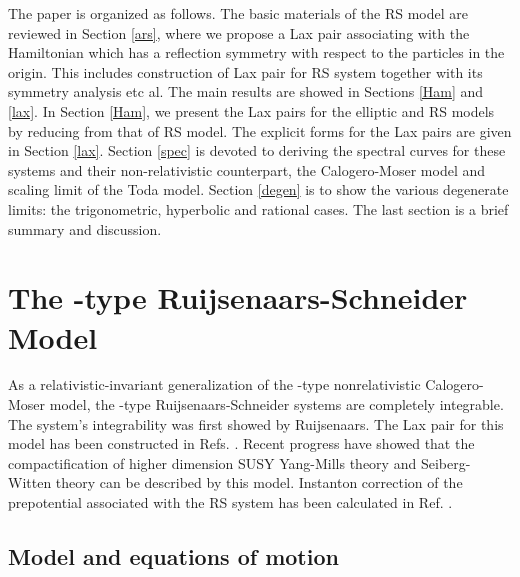 \documentclass[a4paper,12pt]{article}
\begin{document}
The paper is organized as follows. The basic materials of
the \coordHE{} RS model are reviewed in Section \ref{ars},
where we propose a Lax pair associating with the Hamiltonian
which has a reflection symmetry with respect to the
particles in the origin. This includes construction of Lax
pair for \coordHE{} RS system together with its symmetry
analysis etc al. The main results are showed in Sections
\ref{Ham} and \ref{lax}. In Section \ref {Ham}, we present
the Lax pairs for the elliptic \coordHE{} and \coordHE{} RS
models by reducing from that of \coordHE{} RS model. The
explicit forms for the Lax pairs are given in Section
\ref{lax}. Section \ref{spec} is devoted to deriving the
spectral curves for these systems and their non-relativistic
counterpart, the Calogero-Moser model and scaling limit of
the Toda model. Section \ref{degen} is to show the various
degenerate limits: the trigonometric, hyperbolic and
rational cases. The last section is a brief summary and
discussion.

\section{The \coordHE{}-type Ruijsenaars-Schneider Model}

\setcounter{equation}{0} \label{ars}
As a relativistic-invariant
generalization of the \coordHE{}-type nonrelativistic
Calogero-Moser model, the \coordHE{}-type
Ruijsenaars-Schneider systems are completely integrable. The
system's integrability was first showed by
Ruijsenaars\cite{r1,r2}. The Lax pair for this model has
been constructed in Refs. \cite{r1,nksr,bc,kz,s1,s2}. Recent progress have showed that the
compactification of higher dimension SUSY Yang-Mills theory
and Seiberg-Witten theory can be described by this
model\cite{bm1}. Instanton correction of the prepotential
associated with the \coordHE{} RS system has been calculated
in Ref. \cite {ohta}.

\subsection{Model and equations of motion}
\end{document}
